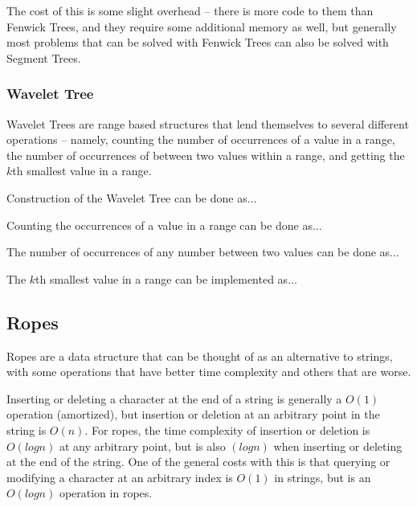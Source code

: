 The cost of this is some slight overhead -- there is more code to them than Fenwick Trees, and they require some additional memory as well, but generally most problems that can be solved with Fenwick Trees can also be solved with Segment Trees.

\subsubsection{Wavelet Tree}

Wavelet Trees are range based structures that lend themselves to several different operations -- namely, counting the number of occurrences of a value in a range, the number of occurrences of between two values within a range, and getting the $k$th smallest value in a range.

Construction of the Wavelet Tree can be done as...

Counting the occurrences of a value in a range can be done as...

The number of occurrences of any number between two values can be done as...

The $k$th smallest value in a range can be implemented as...

\subsection{Ropes}

Ropes are a data structure that can be thought of as an alternative to strings, with some operations that have better time complexity and others that are worse.

Inserting or deleting a character at the end of a string is generally a $O(1)$ operation (amortized), but insertion or deletion at an arbitrary point in the string is $O(n)$. For ropes, the time complexity of insertion or deletion is $O(log n)$ at any arbitrary point, but is also $(log n)$ when inserting or deleting at the end of the string. One of the general costs with this is that querying or modifying a character at an arbitrary index is $O(1)$ in strings, but is an $O(log n)$ operation in ropes.

\hrulefill



\hrulefill
